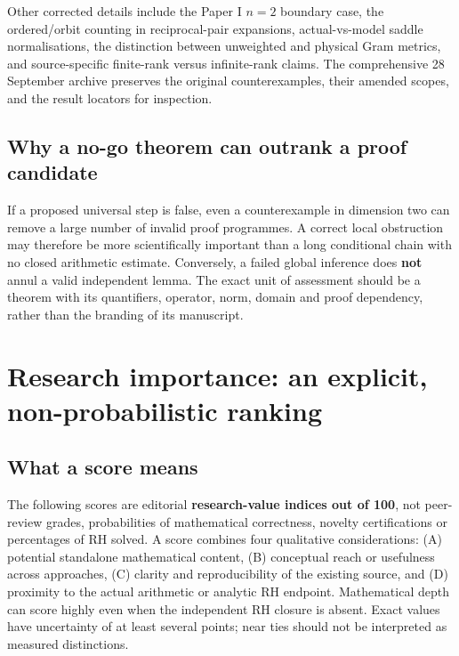 \documentclass[
  10pt,
  a4paper,
  10pt,
  oneside,
  openany]{book}
\begin{document}
Other corrected details include the Paper I \(n=2\) boundary case, the
ordered/orbit counting in reciprocal-pair expansions, actual-vs-model
saddle normalisations, the distinction between unweighted and physical
Gram metrics, and source-specific finite-rank versus infinite-rank
claims. The comprehensive 28 September archive preserves the original
counterexamples, their amended scopes, and the result locators for
inspection.

\subsection{Why a no-go theorem can outrank a proof
candidate}\label{why-a-no-go-theorem-can-outrank-a-proof-candidate}

If a proposed universal step is false, even a counterexample in
dimension two can remove a large number of invalid proof programmes. A
correct local obstruction may therefore be more scientifically important
than a long conditional chain with no closed arithmetic estimate.
Conversely, a failed global inference does \textbf{not} annul a valid
independent lemma. The exact unit of assessment should be a theorem with
its quantifiers, operator, norm, domain and proof dependency, rather
than the branding of its manuscript.

\section{Research importance: an explicit, non-probabilistic
ranking}\label{research-importance-an-explicit-non-probabilistic-ranking}

\subsection{What a score means}\label{what-a-score-means}

The following scores are editorial \textbf{research-value indices out of
100}, not peer-review grades, probabilities of mathematical correctness,
novelty certifications or percentages of RH solved. A score combines
four qualitative considerations: (A) potential standalone mathematical
content, (B) conceptual reach or usefulness across approaches, (C)
clarity and reproducibility of the existing source, and (D) proximity to
the actual arithmetic or analytic RH endpoint. Mathematical depth can
score highly even when the independent RH closure is absent. Exact
values have uncertainty of at least several points; near ties should not
be interpreted as measured distinctions.
\end{document}

